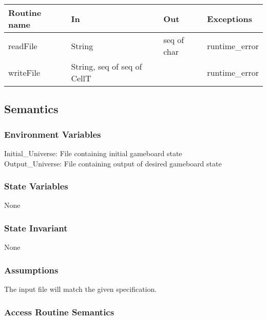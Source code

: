 \documentclass[12pt]{article}
\begin{document}
\begin{tabular}{| l | l | l | l |}
\hline
\textbf{Routine name} & \textbf{In} & \textbf{Out} & \textbf{Exceptions}\\
\hline
readFile & String & seq of char & runtime\_error\\
\hline
writeFile & String, seq of seq of CellT & ~ & runtime\_error\\
\hline
\end{tabular}

\subsection* {Semantics}

\subsubsection* {Environment Variables}

Initial\_Universe: File containing initial gameboard state\\
Output\_Universe: File containing output of desired gameboard state\\

\subsubsection* {State Variables}

None

\subsubsection* {State Invariant}

None

\subsubsection* {Assumptions}

The input file will match the given specification.

\subsubsection* {Access Routine Semantics}
\end{document}
